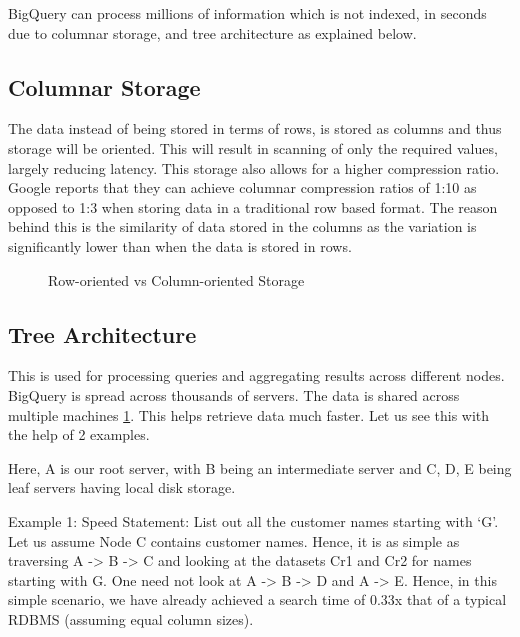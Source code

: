 \documentclass[9pt,twocolumn,twoside]{../../styles/osajnl}
\begin{document}
BigQuery can process millions of information which is not indexed, in seconds
due to columnar storage, and tree architecture as explained below.

\subsection{Columnar Storage}
The data instead of being stored in terms of rows, is stored as
columns and thus storage will be oriented. This will result in scanning
of only the required values, largely reducing latency. This storage
also allows for a higher compression ratio. Google reports
\cite{www-rowvscolumnstorage} that they can achieve columnar
compression ratios of 1:10 as opposed to 1:3 when storing data in a
traditional row based format. The reason behind this is the similarity
of data stored in the columns as the variation is significantly lower
than when the data is stored in rows.

\begin{figure}[htbp]
\centering
{}
\caption{\cite{www-rowvscolumnstorage} Row-oriented vs Column-oriented Storage}
\label{fig:rowvscolumnarstorage}
\end{figure}



\subsection{Tree Architecture}
This is used for processing queries and aggregating results across
different nodes. BigQuery is spread across thousands of servers. The
data is shared across multiple machines
\ref{fig:rowvscolumnarstorage}. This helps retrieve data much
faster. Let us see this with the help of 2 examples.

\noindent
Here, A is our root server, with B being an intermediate server and C,
D, E being leaf servers having local disk storage.\newline

\noindent
Example 1: Speed \newline
Statement: List out all the customer names starting with ‘G’.\newline
\noindent
Let us assume Node C contains customer names.  Hence, it is as simple
as traversing A -> B -> C and looking at the datasets Cr1 and Cr2 for
names starting with G. One need not look at A -> B -> D and A ->
E. Hence, in this simple scenario, we have already achieved a search
time of 0.33x that of a typical RDBMS (assuming equal column sizes).\newline
\end{document}
